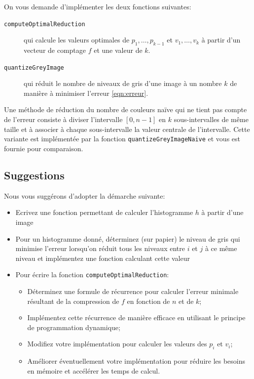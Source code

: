\documentclass[a4paper,10pt]{article}
\begin{document}
On vous demande d'implémenter les deux fonctions suivantes:
\begin{description}
\item[\texttt{computeOptimalReduction}] qui calcule les valeurs optimales de $p_1,\ldots,p_{k-1}$ et $v_1,\ldots,v_k$ à partir d'un vecteur de comptage $f$ et une valeur de $k$.
\item[\texttt{quantizeGreyImage}] qui réduit le nombre de niveaux de gris d'une image à un nombre $k$ de manière à minimiser l'erreur \ref{eqn:erreur}.
\end{description}

Une méthode de réduction du nombre de couleurs naïve qui ne tient pas
compte de l'erreur consiste à diviser l'intervalle $[0,n-1]$ en $k$
sous-intervalles de même taille et à associer à chaque sous-intervalle
la valeur centrale de l'intervalle. Cette variante est implémentée par
la fonction \texttt{quantizeGreyImageNaive} et vous est fournie pour
comparaison.


\subsection*{Suggestions}

Nous vous suggérons d'adopter la démarche suivante:
\begin{itemize}
\item Ecrivez une fonction permettant de calculer l'histogramme $h$ à
  partir d'une image
\item Pour un histogramme donné, déterminez (sur papier) le niveau de gris qui minimise l'erreur lorsqu'on réduit tous les niveaux entre $i$ et $j$ à ce même niveau et implémentez une fonction calculant cette valeur
\item Pour écrire la fonction \texttt{computeOptimalReduction}:
\begin{itemize}
\item Déterminez une formule de récurrence pour calculer l'erreur minimale résultant de la compression de $f$ en fonction de $n$ et de $k$;
\item Implémentez cette récurrence de manière efficace en utilisant le principe de programmation dynamique;
\item Modifiez votre implémentation pour calculer les valeurs des $p_i$ et $v_i$;
\item Améliorer éventuellement votre implémentation pour réduire les
  besoins en mémoire et accélérer les temps de calcul.
\end{itemize}
\end{itemize}
\end{document}
